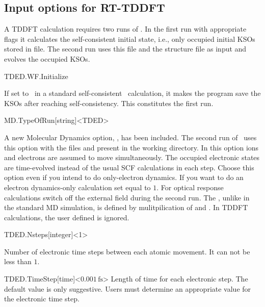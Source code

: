 \subsection{Input options for RT-TDDFT}

A TDDFT calculation requires two runs of \siesta. In the first run
with appropriate flags it calculates the self-consistent initial
state, i.e., only occupied initial KSOs stored in 
file. The second run uses this file and the structure 
file  as input and evolves the occupied
KSOs.

\begin{fdflogicalF}{TDED.WF.Initialize}

If set to \fdftrue\ in a standard self-consistent \siesta\ calculation, it
makes the program save the KSOs after reaching
self-consistency. This constitutes the first run.

\end{fdflogicalF}

\begin{fdfentry}{MD.TypeOfRun}[string]<TDED>

  A new Molecular Dynamics option, , has been included. The
  second run of \siesta\ uses this option with the files
   and  present in the working directory.
  In this option ions and electrons are assumed to move
  simultaneously. The occupied electronic states are time-evolved
  instead of the usual SCF calculations in each step.  Choose this
  option even if you intend to do only-electron dynamics. If you want
  to do an electron dynamics-only calculation set
   equal to $1$. For optical response
  calculations switch off the external field during the second
  run. The , unlike in the standard MD
  simulation, is defined by mulitpilication of  and
  . In TDDFT calculations, the user defined
   is ignored.

\end{fdfentry}

\begin{fdfentry}{TDED.Nsteps}[integer]<1>

Number of electronic time steps between each atomic movement. It can not be less
than $1$.

\end{fdfentry}
\begin{fdfentry}{TDED.TimeStep}[time]<$0.001\,\mathrm{fs}$>
Length of time for each electronic step. The default value is only suggestive. Users must
determine an appropriate value for the electronic time step. 

\end{fdfentry}

